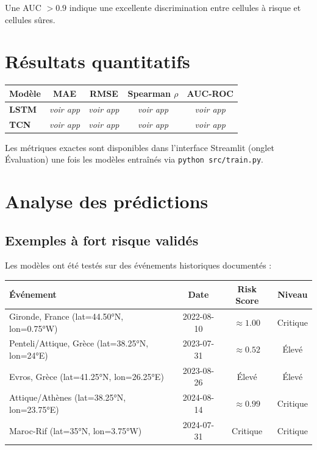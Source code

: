 \documentclass[12pt,a4paper]{report}
\begin{document}
Une AUC $> 0.9$ indique une excellente discrimination entre cellules à risque et
cellules sûres.

\section{Résultats quantitatifs}

\begin{center}
\begin{tabular}{lcccc}
\toprule
\rowcolor{fireOrange!15}
\textbf{Modèle} & \textbf{MAE} & \textbf{RMSE} & \textbf{Spearman $\rho$} & \textbf{AUC-ROC} \\
\midrule
\textcolor{lstmBlue}{\textbf{LSTM}}
  & \textit{voir app}  & \textit{voir app}  & \textit{voir app}  & \textit{voir app}  \\
\textcolor{tcnRed}{\textbf{TCN}}
  & \textit{voir app}  & \textit{voir app}  & \textit{voir app}  & \textit{voir app}  \\
\bottomrule
\end{tabular}
\end{center}

Les métriques exactes sont disponibles dans l'interface Streamlit (onglet Évaluation)
une fois les modèles entraînés via \texttt{python src/train.py}.

\section{Analyse des prédictions}

\subsection{Exemples à fort risque validés}

Les modèles ont été testés sur des événements historiques documentés :

\begin{center}
\begin{tabularx}{\textwidth}{Xccc}
\toprule
\rowcolor{fireOrange!15}
\textbf{Événement} & \textbf{Date} & \textbf{Risk Score} & \textbf{Niveau} \\
\midrule
Gironde, France (lat=44.50°N, lon=0.75°W)       & 2022-08-10 & $\approx 1.00$ & \textcolor{riskRed}{Critique} \\
Penteli/Attique, Grèce (lat=38.25°N, lon=24°E)  & 2023-07-31 & $\approx 0.52$ & \textcolor{riskOrange}{Élevé} \\
Evros, Grèce (lat=41.25°N, lon=26.25°E)         & 2023-08-26 & Élevé          & \textcolor{riskOrange}{Élevé} \\
Attique/Athènes (lat=38.25°N, lon=23.75°E)      & 2024-08-14 & $\approx 0.99$ & \textcolor{riskRed}{Critique} \\
Maroc-Rif (lat=35°N, lon=3.75°W)                & 2024-07-31 & Critique       & \textcolor{riskRed}{Critique} \\
\bottomrule
\end{tabularx}
\end{center}
\end{document}
